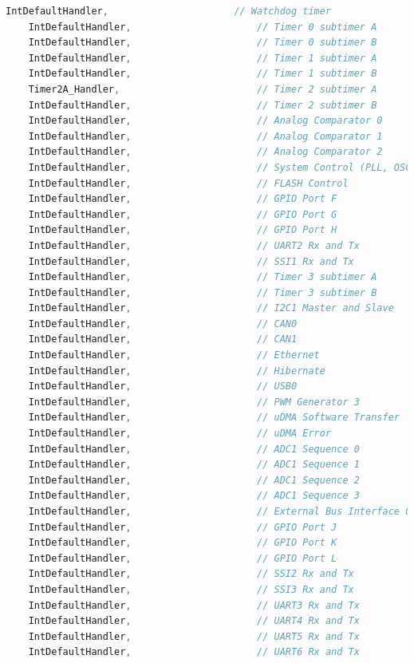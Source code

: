 \documentclass{article}
\begin{document}
\begin{lstlisting}[language=c, caption={startup$\textunderscore$ccs.c}, captionpos=b]
    IntDefaultHandler,                      // Watchdog timer
    IntDefaultHandler,                      // Timer 0 subtimer A
    IntDefaultHandler,                      // Timer 0 subtimer B
    IntDefaultHandler,                      // Timer 1 subtimer A
    IntDefaultHandler,                      // Timer 1 subtimer B
    Timer2A_Handler,                        // Timer 2 subtimer A
    IntDefaultHandler,                      // Timer 2 subtimer B
    IntDefaultHandler,                      // Analog Comparator 0
    IntDefaultHandler,                      // Analog Comparator 1
    IntDefaultHandler,                      // Analog Comparator 2
    IntDefaultHandler,                      // System Control (PLL, OSC, BO)
    IntDefaultHandler,                      // FLASH Control
    IntDefaultHandler,                      // GPIO Port F
    IntDefaultHandler,                      // GPIO Port G
    IntDefaultHandler,                      // GPIO Port H
    IntDefaultHandler,                      // UART2 Rx and Tx
    IntDefaultHandler,                      // SSI1 Rx and Tx
    IntDefaultHandler,                      // Timer 3 subtimer A
    IntDefaultHandler,                      // Timer 3 subtimer B
    IntDefaultHandler,                      // I2C1 Master and Slave
    IntDefaultHandler,                      // CAN0
    IntDefaultHandler,                      // CAN1
    IntDefaultHandler,                      // Ethernet
    IntDefaultHandler,                      // Hibernate
    IntDefaultHandler,                      // USB0
    IntDefaultHandler,                      // PWM Generator 3
    IntDefaultHandler,                      // uDMA Software Transfer
    IntDefaultHandler,                      // uDMA Error
    IntDefaultHandler,                      // ADC1 Sequence 0
    IntDefaultHandler,                      // ADC1 Sequence 1
    IntDefaultHandler,                      // ADC1 Sequence 2
    IntDefaultHandler,                      // ADC1 Sequence 3
    IntDefaultHandler,                      // External Bus Interface 0
    IntDefaultHandler,                      // GPIO Port J
    IntDefaultHandler,                      // GPIO Port K
    IntDefaultHandler,                      // GPIO Port L
    IntDefaultHandler,                      // SSI2 Rx and Tx
    IntDefaultHandler,                      // SSI3 Rx and Tx
    IntDefaultHandler,                      // UART3 Rx and Tx
    IntDefaultHandler,                      // UART4 Rx and Tx
    IntDefaultHandler,                      // UART5 Rx and Tx
    IntDefaultHandler,                      // UART6 Rx and Tx

\end{lstlisting}
\end{document}

